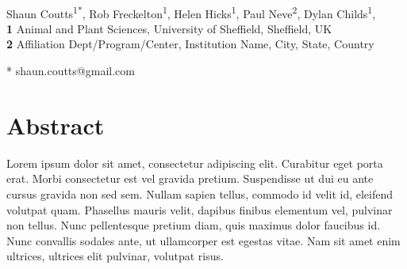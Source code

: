 \documentclass[10pt,letterpaper]{article}
\date{}
\begin{document}
\vspace*{0.2in}

\begin{flushleft}
{\Large
\textbf{} %
}
\newline
\\
Shaun Coutts\textsuperscript{1*},
Rob Freckelton\textsuperscript{1},
Helen Hicks\textsuperscript{1},
Paul Neve\textsuperscript{2},
Dylan Childs\textsuperscript{1},
\\
\bigskip
\textbf{1} Animal and Plant Sciences, University of Sheffield, Sheffield, UK
\\
\textbf{2} Affiliation Dept/Program/Center, Institution Name, City, State, Country
\\
\bigskip

% 
%





* shaun.coutts@gmail.com

\end{flushleft}
\section*{Abstract}
Lorem ipsum dolor sit amet, consectetur adipiscing elit. Curabitur eget porta erat. Morbi consectetur est vel gravida pretium. Suspendisse ut dui eu ante cursus gravida non sed sem. Nullam sapien tellus, commodo id velit id, eleifend volutpat quam. Phasellus mauris velit, dapibus finibus elementum vel, pulvinar non tellus. Nunc pellentesque pretium diam, quis maximus dolor faucibus id. Nunc convallis sodales ante, ut ullamcorper est egestas vitae. Nam sit amet enim ultrices, ultrices elit pulvinar, volutpat risus.
\end{document}
